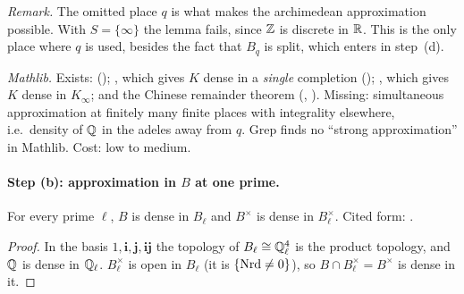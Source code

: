 \noindent\emph{Remark.} The omitted place $q$ is what makes the archimedean approximation possible. With $S=\{\infty\}$ the
lemma fails, since $\mathbb{Z}$ is discrete in $\mathbb{R}$. This is the only place where $q$ is used, besides the fact that $B_q$ is split,
which enters in step~(d).

\begin{sloppypar}\noindent\emph{Mathlib.} Exists:  ();
, which gives $K$ dense in a \emph{single} completion
(); , which gives
$K$ dense in $K_\infty$; and the Chinese remainder theorem (,
). Missing: simultaneous approximation at finitely many finite places with integrality elsewhere,
i.e.\ density of $\mathbb{Q}$ in the adeles away from $q$. Grep finds no ``strong approximation'' in Mathlib. Cost: low to medium.\end{sloppypar}

\paragraph{Step (b): approximation in $B$ at one prime.}

\begin{lemma}\label{lem:s02-sa-step-b}
For every prime $\ell$, $B$ is dense in $B_\ell$ and $B^\times$ is dense in $B_\ell^\times$.
\stproved{} Cited form: .
\end{lemma}

\begin{proof}
In the basis $1,\mathbf i,\mathbf j,\mathbf{ij}$ the topology of $B_\ell\cong\mathbb{Q}_\ell^4$ is the product topology, and $\mathbb{Q}$ is dense in
$\mathbb{Q}_\ell$. $B_\ell^\times$ is open in $B_\ell$ (it is $\{\mathrm{Nrd}\ne0\}$), so $B\cap B^\times_\ell=B^\times$ is dense in it.
\end{proof}

